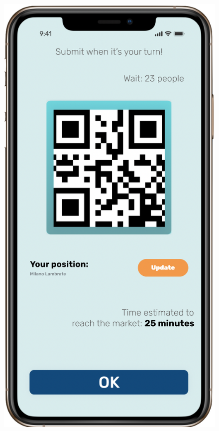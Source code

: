 \begin{figure}[H]
\begin{center}
{            \includegraphics[scale=0.30]{images/mockup/qr_reservation.png}
        }%
%
    \end{center}
    
   \label{fig:subfigures}
\end{figure}


